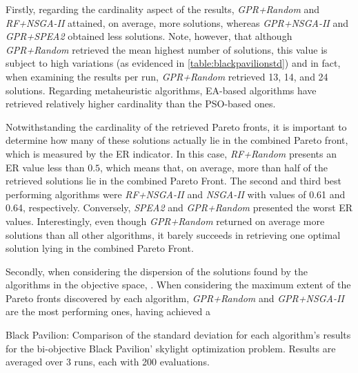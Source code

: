 Firstly, regarding the cardinality aspect of the results, \textit{GPR+Random} and \textit{RF+NSGA-II} attained, on average, more solutions, whereas \textit{GPR+NSGA-II} and \textit{GPR+SPEA2} obtained less solutions. Note, however, that although \textit{GPR+Random} retrieved the mean highest number of solutions, this value is subject to high variations (as evidenced in \cref{table:blackpavilionstd}) and in fact, when examining the results per run, \textit{GPR+Random} retrieved 13, 14, and 24 solutions. Regarding metaheuristic algorithms, \ac{EA}-based algorithms have retrieved relatively higher cardinality than the \ac{PSO}-based ones. 

Notwithstanding the cardinality of the retrieved Pareto fronts, it is important to determine how many of these solutions actually lie in the combined Pareto front, which is measured by the \ac{ER} indicator. In this case, \textit{RF+Random} presents an \ac{ER} value less than $0.5$, which means that, on average, more than half of the retrieved solutions lie in the combined Pareto Front. The second and third best performing algorithms were \textit{RF+NSGA-II} and \textit{\ac{NSGA-II}} with values of 0.61 and 0.64, respectively. Conversely, \textit{\ac{SPEA2}} and \textit{GPR+Random} presented the worst \ac{ER} values. Interestingly, even though \textit{GPR+Random} returned on average more solutions than all other algorithms, it barely succeeds in retrieving one optimal solution lying in the combined Pareto Front.

Secondly, when considering the dispersion of the solutions found by the algorithms in the objective space, . When considering the maximum extent of the Pareto fronts discovered by each algorithm, \textit{GPR+Random} and \textit{GPR+NSGA-II} are the most performing ones, having achieved a  

\begin{table}[htbp]
	\centering
	\caption[Black Pavilion: Standard deviation values of the algorithms' results]{Black Pavilion: Comparison of the standard deviation for each algorithm's results for the bi-objective Black Pavilion' skylight optimization problem. Results are averaged over 3 runs, each with 200 evaluations.}
	\label{table:blackpavilionstd}
\end{table}

